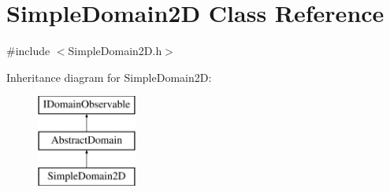 \hypertarget{class_simple_domain2_d}{}\section{Simple\+Domain2D Class Reference}
\label{class_simple_domain2_d}


{\ttfamily \#include $<$Simple\+Domain2\+D.\+h$>$}

Inheritance diagram for Simple\+Domain2D\+:\begin{figure}[H]
\begin{center}
\leavevmode
\includegraphics[height=3.000000cm]{dd/dd9/class_simple_domain2_d}
\end{center}
\end{figure}
